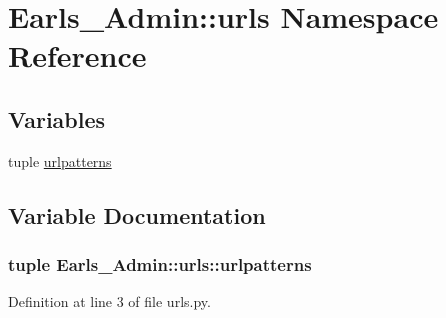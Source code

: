 \hypertarget{namespaceEarls__Admin_1_1urls}{
\section{Earls\_\-Admin::urls Namespace Reference}
\label{namespaceEarls__Admin_1_1urls}
}


\subsection*{Variables}
\begin{CompactItemize}
\item 
tuple \hyperlink{namespaceEarls__Admin_1_1urls_a801c4d62e40b3e26476004e64923052}{urlpatterns}
\end{CompactItemize}


\subsection{Variable Documentation}
\hypertarget{namespaceEarls__Admin_1_1urls_a801c4d62e40b3e26476004e64923052}{
\subsubsection[urlpatterns]{\setlength{\rightskip}{0pt plus 5cm}tuple {\bf Earls\_\-Admin::urls::urlpatterns}}}
\label{namespaceEarls__Admin_1_1urls_a801c4d62e40b3e26476004e64923052}




Definition at line 3 of file urls.py.